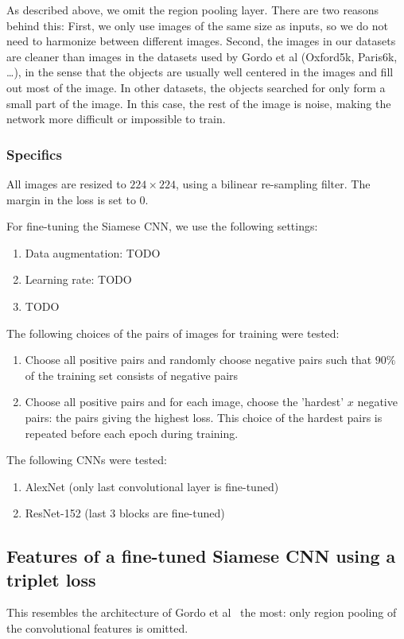 \documentclass[fleqn]{article}
\begin{document}
As described above, we omit the region pooling layer. There are two
reasons behind this: First, we only use images of the same size
as inputs, so we do not need to harmonize between different images.
Second, the images in our datasets are cleaner than images in the
datasets used by Gordo et al (Oxford5k, Paris6k, \dots), in the sense
that the objects are usually well centered in the images and fill out
most of the image. In other datasets, the objects searched for
only form a small part of the image. In this case, the rest of the image
is noise, making the network more difficult or impossible to train.

\subsubsection{Specifics}
All images are resized to $224 \times 224$, using a bilinear
re-sampling filter. The margin in the loss is set to 0.

For fine-tuning the Siamese CNN, we use the following settings:
\begin{enumerate}
    \item Data augmentation: TODO
    \item Learning rate: TODO
    \item TODO
\end{enumerate}

The following choices of the pairs of images for training were tested:
\begin{enumerate}
    \item Choose all positive pairs and randomly choose negative pairs
    such that $90\%$ of the training set consists of negative pairs
    \item Choose all positive pairs and for each image, choose the
    'hardest' $x$ negative pairs: the pairs giving the highest loss.
    This choice of the hardest pairs is repeated before each epoch
    during training.
\end{enumerate}

The following CNNs were tested:
\begin{enumerate}
    \item AlexNet (only last convolutional layer is fine-tuned)
    \item ResNet-152 (last 3 blocks are fine-tuned)
\end{enumerate}

\subsection{Features of a fine-tuned Siamese CNN using a triplet loss}
This resembles the architecture of Gordo et al~\cite{gordo_deep_2016}
the most: only region pooling of the convolutional features is omitted.
\end{document}
